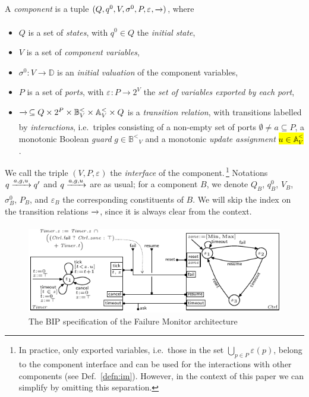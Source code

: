 \documentclass{llncs}
\newcommand{\defn}[1]{Def.~\ref{defn:#1}}
\newcommand{\sA}{\ensuremath{\mathbb{A}}}
\newcommand{\sB}{\ensuremath{\mathbb{B}}}
\newcommand{\sD}{\ensuremath{\mathbb{D}}}
\newcommand{\ie}[1][\ ]{i.e.#1}
\newcommand{\goesto}[2][]{\ensuremath{\xrightarrow[{#1}\relax]{#2}}}
\newcommand{\order}{<}
\newcommand{\ordbool}{\ensuremath{\sB^{\order}}}
\newcommand{\data}{\ensuremath{\sD}}
\newcommand{\guards}[1]{\ensuremath{\ordbool_{#1}}}
\newcommand{\updates}[1]{\ensuremath{\sA^{\order}_{#1}}}
\newcommand{\val}[3][]{\ensuremath{#1{\sigma}^{#2}_{#3}}}
\newcommand{\export}[1][]{\ensuremath{\varepsilon_{#1}}}
\begin{document}
\begin{definition}[Components]
  \label{defn:component}
  A \emph{component} is a tuple $(Q, q^0, V, \val{0}{}, P,
  \export, \goesto{})$, where
  \begin{itemize}
  \item $Q$ is a set of \emph{states}, with $q^0 \in Q$ the
    \emph{initial state}, 
  \item $V$ is a set of \emph{component variables},
  \item $\val{0}{} : V \rightarrow \data$ is an \emph{initial
    valuation} of the component variables, 
  \item $P$ is a set of \emph{ports}, with
    $\export : P \rightarrow 2^V$ 
    the \emph{set of variables exported by each port},
  \item $\goesto{}\, \subseteq
    Q \times 2^P \times \guards{V} \times \updates{V} \times Q$
%
    is a \emph{transition relation}, with transitions
    labelled by \emph{interactions}, \ie triples consisting of a non-empty set of ports
    $\emptyset \neq a \subseteq P$, a monotonic Boolean \emph{guard} $g \in
    \guards{V}$ and a monotonic \emph{update assignment} \hl{$u \in
    \updates{V}$}.
  \end{itemize}
%
  We call the triple $(V,P, \export)$ the \emph{interface} of the
  component.\,\footnote{%
%
  In practice, only exported variables, \ie those in the set
  $\bigcup_{p \in P}\export(p)$, belong to the component interface and
  can be used for the interactions with other components (see
  \defn{im}).  However, in the context of this paper we can simplify
  by omitting this separation.
%
  }
%
  Notations $q \goesto{a, g, u} q'$ and $q \goesto{a, g, u}$ are as usual;
  for a component $B$, we denote $Q_B$, $q^0_B$, $V_B$, $\val{0}{B}$, $P_B$,
  and $\export[B]$ the corresponding constituents of $B$.  We will
  skip the index on the transition relations $\goesto{}$, since it
  is always clear from the context.
\end{definition}

\begin{figure}[t]
  \centering
  \includegraphics[width=\columnwidth]{BIPspec-ArchFailureTimerMax-v4}
  \caption{The BIP specification of the Failure Monitor architecture}
  \label{fig:schema:ArchFailure:BIP}
\end{figure}
\end{document}
